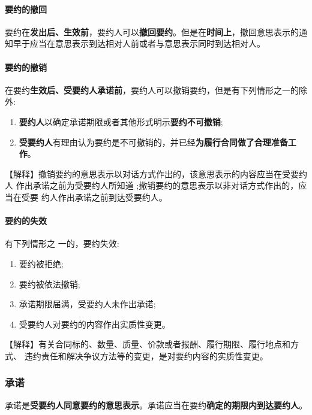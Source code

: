 \documentclass[UTF8,12pt]{ctexart}
\numberwithin{equation}{section} %
\numberwithin{figure}{section}
\numberwithin{table}{section}
\begin{document}
	
	\paragraph{要约的撤回}
	要约在\textbf{发出后、生效前}，要约人可以\textbf{撤回要约}。但是在\textbf{时间上}，撤回意思表示的通知早于应当在意思表示到达相对人前或者与意思表示同时到达相对人。
	
	\paragraph{要约的撤销}
	在要约\textbf{生效后、受要约人承诺前}，要约人可以撤销要约，但是有下列情形之一的除外: 
	\begin{enumerate}
		\item \textbf{要约人}以确定承诺期限或者其他形式明示\textbf{要约不可撤销};
		
		\item \textbf{受要约人}有理由认为要约是不可撤销的，并已经\textbf{为履行合同做了合理准备工作}。
	\end{enumerate}
	
	【解释】撤销要约的意思表示以对话方式作出的，该意思表示的内容应当在受要约人 作出承诺之前为受要约人所知道 ;撤销要约的意思表示以非对话方式作出的，应当在受要 约人作出承诺之前到达受要约人。
	
	\paragraph{要约的失效}
	有下列情形之 一的，要约失效:
	\begin{enumerate}
		\item 要约被拒绝;
		
		\item 要约被依法撤销;
		
		\item 承诺期限届满，受要约人未作出承诺;
		
		\item 受要约人对要约的内容作出实质性变更。 
	\end{enumerate}
	
	【解释】有关合同标的、数量、质量、价款或者报酬、履行期限、履行地点和方式、 违约责任和解决争议方法等的变更，是对要约内容的实质性变更。
	
	\subsubsection{承诺}
	
	承诺是\textbf{受要约人同意要约的意思表示}。承诺应当在要约\textbf{确定的期限内到达要约人}。
	
\end{document}
